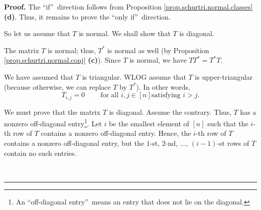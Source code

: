 \documentclass[numbers=enddot,12pt,final,onecolumn,notitlepage]{scrartcl}%
\numberwithin{exer}{subsection}
\theoremstyle{definition}
\newenvironment{proof}[1][Proof]{\noindent\textbf{#1.} }{\ \rule{0.5em}{0.5em}}
\begin{document}
\begin{proof}
The \textquotedblleft if\textquotedblright\ direction follows from Proposition
\ref{prop.schurtri.normal.classes} \textbf{(d)}. Thus, it remains to prove the
\textquotedblleft only if\textquotedblright\ direction.

So let us assume that $T$ is normal. We shall show that $T$ is diagonal.

The matrix $T$ is normal; thus, $T^{\ast}$ is normal as well (by Proposition
\ref{prop.schurtri.normal.conj} \textbf{(c)}). Since $T$ is normal, we have
$TT^{\ast}=T^{\ast}T$.

We have assumed that $T$ is triangular. WLOG assume that $T$ is
upper-triangular (because otherwise, we can replace $T$ by $T^{\ast}$). In
other words,%
\begin{equation}
T_{i,j}=0\ \ \ \ \ \ \ \ \ \ \text{for all }i,j\in\left[  n\right]  \text{
satisfying }i>j. \label{pf.lem.schurtri.normal.tri.tria}%
\end{equation}


We must prove that the matrix $T$ is diagonal. Assume the contrary. Thus, $T$
has a nonzero off-diagonal entry\footnote{An \textquotedblleft off-diagonal
entry\textquotedblright\ means an entry that does not lie on the diagonal.}.
Let $i$ be the smallest element of $\left[  n\right]  $ such that the $i$-th
row of $T$ contains a nonzero off-diagonal entry. Hence, the $i$-th row of $T$
contains a nonzero off-diagonal entry, but the $1$-st, $2$-nd, $\ldots$,
$\left(  i-1\right)  $-st rows of $T$ contain no such entries.


\end{proof}
\end{document}
